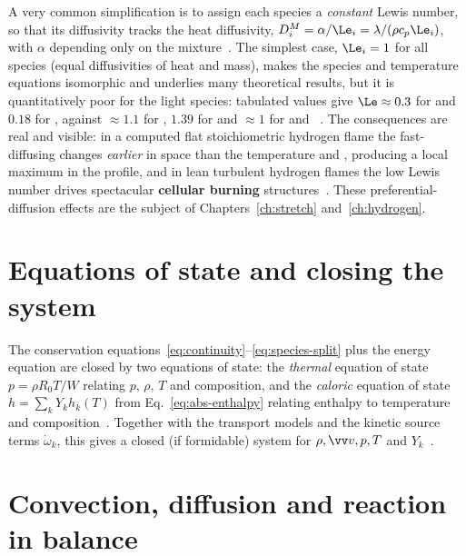A very common simplification is to assign each species a \emph{constant} Lewis number, so that its diffusivity tracks the heat diffusivity, $D_i^M=\alpha/\Le_i=\lambda/(\rho c_p\Le_i)$, with $\alpha$ depending only on the mixture~\cite{lecture8}. The simplest case, $\Le_i=1$ for all species (equal diffusivities of heat and mass), makes the species and temperature equations isomorphic and underlies many theoretical results, but it is quantitatively poor for the light species: tabulated values give $\Le\approx0.3$ for  and $0.18$ for , against $\approx1.1$ for , $1.39$ for  and $\approx1$ for  and ~\cite{lecture8}. The consequences are real and visible: in a computed flat stoichiometric hydrogen flame the fast-diffusing  changes \emph{earlier} in space than the temperature and , producing a local maximum in the  profile, and in lean turbulent hydrogen flames the low Lewis number drives spectacular \textbf{cellular burning} structures~\cite{lecture8,warnatz2006combustion,day2009cellular}. These preferential-diffusion effects are the subject of Chapters~\ref{ch:stretch} and~\ref{ch:hydrogen}.

\section{Equations of state and closing the system}

The conservation equations~\eqref{eq:continuity}--\eqref{eq:species-split} plus the energy equation are closed by two equations of state: the \emph{thermal} equation of state $p=\rho R_0 T/W$ relating $p$, $\rho$, $T$ and composition, and the \emph{caloric} equation of state $h=\sum_k Y_k h_k(T)$ from Eq.~\eqref{eq:abs-enthalpy} relating enthalpy to temperature and composition~\cite{lecture8}. Together with the transport models and the kinetic source terms $\dot\omega_k$, this gives a closed (if formidable) system for $\rho,\vv v,p,T$ and $Y_k$~\cite{lecture8,maas_combustion_lecture}.

\section{Convection, diffusion and reaction in balance}

